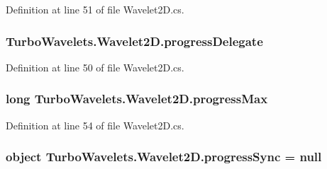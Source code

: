 \-Definition at line 51 of file \-Wavelet2\-D.\-cs.

\hypertarget{class_turbo_wavelets_1_1_wavelet2_d_a41d9135f22a6b2cb661b2cc2ccb768ff}{
\subsubsection[{progress\-Delegate}]{ {\bf \-Turbo\-Wavelets.\-Wavelet2\-D.\-progress\-Delegate}}}\label{class_turbo_wavelets_1_1_wavelet2_d_a41d9135f22a6b2cb661b2cc2ccb768ff}


\-Definition at line 50 of file \-Wavelet2\-D.\-cs.

\hypertarget{class_turbo_wavelets_1_1_wavelet2_d_a7cbf7ce44310a48178f36101a4c03add}{
\subsubsection[{progress\-Max}]{\setlength{\rightskip}{0pt plus 5cm}long {\bf \-Turbo\-Wavelets.\-Wavelet2\-D.\-progress\-Max}}}\label{class_turbo_wavelets_1_1_wavelet2_d_a7cbf7ce44310a48178f36101a4c03add}


\-Definition at line 54 of file \-Wavelet2\-D.\-cs.

\hypertarget{class_turbo_wavelets_1_1_wavelet2_d_a08a8ff6259f0d66913715c00ed6e167b}{
\subsubsection[{progress\-Sync}]{\setlength{\rightskip}{0pt plus 5cm}object {\bf \-Turbo\-Wavelets.\-Wavelet2\-D.\-progress\-Sync} = null}}\label{class_turbo_wavelets_1_1_wavelet2_d_a08a8ff6259f0d66913715c00ed6e167b}


